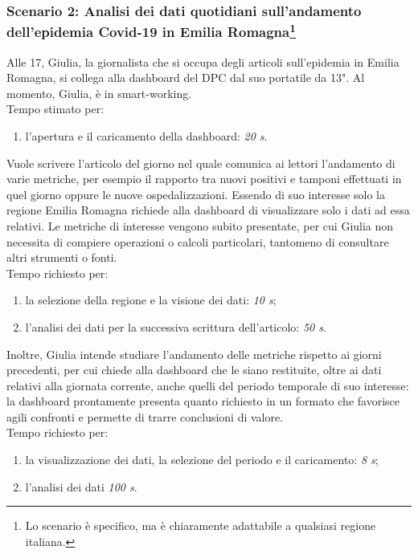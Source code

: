 \subsubsection[Scenario 2: Analisi dei dati quotidiani sull'andamento dell'epidemia Covid-19 in Emilia Romagna]{Scenario 2: Analisi dei dati quotidiani sull'andamento dell'epidemia Covid-19 in Emilia Romagna\footnote{Lo scenario è specifico, ma è chiaramente adattabile a qualsiasi regione italiana.}}
Alle 17, Giulia, la giornalista che si occupa degli articoli sull'epidemia in Emilia Romagna, si collega alla dashboard del DPC dal suo portatile da 13". Al momento, Giulia, è in smart-working.\\
Tempo stimato per:
\begin{enumerate}
    \item l'apertura e il caricamento della dashboard: \textit{20 s}.
\end{enumerate}

\noindent
Vuole scrivere l'articolo del giorno nel quale comunica ai lettori l'andamento di varie metriche, per esempio il rapporto tra nuovi positivi e tamponi effettuati in quel giorno oppure le nuove ospedalizzazioni. Essendo di suo interesse solo la regione Emilia Romagna richiede alla dashboard di visualizzare solo i dati ad essa relativi. Le metriche di interesse vengono subito presentate, per cui Giulia non necessita di compiere operazioni o calcoli particolari, tantomeno di consultare altri strumenti o fonti.\\
Tempo richiesto per:
\begin{enumerate}
    \item la selezione della regione e la visione dei dati: \textit{10 s};
    \item l'analisi dei dati per la successiva scrittura dell'articolo: \textit{50 s}.
\end{enumerate}

\noindent
Inoltre, Giulia intende studiare l'andamento delle metriche rispetto ai giorni precedenti, per cui chiede alla dashboard che le siano restituite, oltre ai dati relativi alla giornata corrente, anche quelli del periodo temporale di suo interesse: la dashboard prontamente presenta quanto richiesto in un formato che favorisce agili confronti e permette di trarre conclusioni di valore.\\
Tempo richiesto per:
\begin{enumerate}
    \item la visualizzazione dei dati, la selezione del periodo e il caricamento: \textit{8 s};
    \item l'analisi dei dati \textit{100 s}.
\end{enumerate}

